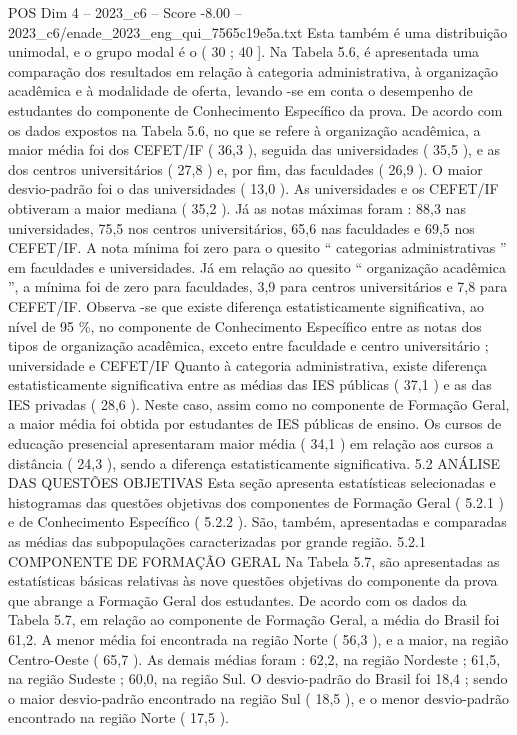 \begin{textsample}{POS Dim 4 – 2023\_c6 – Score -8.00 – 2023\_c6/enade\_2023\_eng\_qui\_7565c19e5a.txt}
Esta também é uma distribuição unimodal, e o grupo modal é o ( 30 ; 40 ].
Na Tabela 5.6, é apresentada uma comparação dos resultados em relação à categoria administrativa, à organização acadêmica e à modalidade de oferta, levando -se em conta o desempenho de estudantes do componente de Conhecimento Específico da prova.
De acordo com os dados expostos na Tabela 5.6, no que se refere à organização acadêmica, a maior média foi dos CEFET/IF ( 36,3 ), seguida das universidades ( 35,5 ), e as dos centros universitários ( 27,8 ) e, por fim, das faculdades ( 26,9 ).
O maior desvio-padrão foi o das universidades ( 13,0 ).
As universidades e os CEFET/IF obtiveram a maior mediana ( 35,2 ).
Já as notas máximas foram : 88,3 nas universidades, 75,5 nos centros universitários, 65,6 nas faculdades e 69,5 nos CEFET/IF.
A nota mínima foi zero para o quesito “ categorias administrativas ” em faculdades e universidades.
Já em relação ao quesito “ organização acadêmica ”, a mínima foi de zero para faculdades, 3,9 para centros universitários e 7,8 para CEFET/IF.
Observa -se que existe diferença estatisticamente significativa, ao nível de 95 \%, no componente de Conhecimento Específico entre as notas dos tipos de organização acadêmica, exceto entre faculdade e centro universitário ; universidade e CEFET/IF Quanto à categoria administrativa, existe diferença estatisticamente significativa entre as médias das IES públicas ( 37,1 ) e as das IES privadas ( 28,6 ).
Neste caso, assim como no componente de Formação Geral, a maior média foi obtida por estudantes de IES públicas de ensino.
Os cursos de educação presencial apresentaram maior média ( 34,1 ) em relação aos cursos a distância ( 24,3 ), sendo a diferença estatisticamente significativa. 5.2 ANÁLISE DAS QUESTÕES OBJETIVAS Esta seção apresenta estatísticas selecionadas e histogramas das questões objetivas dos componentes de Formação Geral ( 5.2.1 ) e de Conhecimento Específico ( 5.2.2 ).
São, também, apresentadas e comparadas as médias das subpopulações caracterizadas por grande região. 5.2.1 COMPONENTE DE FORMAÇÃO GERAL Na Tabela 5.7, são apresentadas as estatísticas básicas relativas às nove questões objetivas do componente da prova que abrange a Formação Geral dos estudantes.
De acordo com os dados da Tabela 5.7, em relação ao componente de Formação Geral, a média do Brasil foi 61,2.
A menor média foi encontrada na região Norte ( 56,3 ), e a maior, na região Centro-Oeste ( 65,7 ).
As demais médias foram : 62,2, na região Nordeste ; 61,5, na região Sudeste ; 60,0, na região Sul.
O desvio-padrão do Brasil foi 18,4 ; sendo o maior desvio-padrão encontrado na região Sul ( 18,5 ), e o menor desvio-padrão encontrado na região Norte ( 17,5 ).

\end{textsample}
